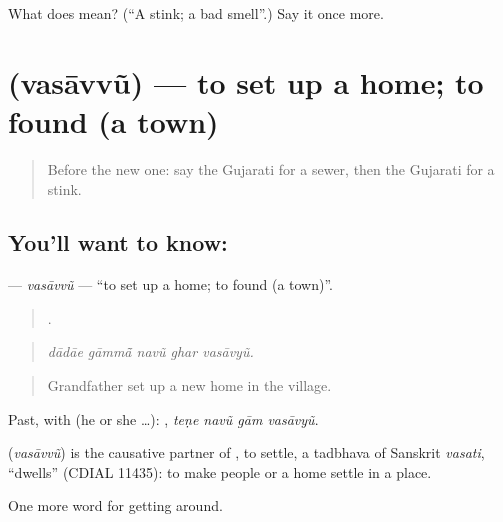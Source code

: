 \begin{tcolorbox}[breakable,colback=teal!4,colframe=teal!35!black,title={Before you move on}]
What does  mean? (\textquotedblleft{}A stink; a bad smell\textquotedblright{}.) Say it once more.
\end{tcolorbox}
\section[\texorpdfstring{\gu{વસાવવું} (vasāvvũ)}{વસાવવું (vasāvvũ)}]{ (vasāvvũ) — to set up a home; to found (a town)}

\label{lesson:GU-C423-vasavvu}



\begin{quote}
Before the new one: say the Gujarati for a sewer, then the Gujarati for a stink.
\end{quote}

\subsection*{You'll want to know: }
\textbf{} — \emph{vasāvvũ} — \textquotedblleft{}to set up a home; to found (a town)\textquotedblright{}.

\begin{quote}
    .
\end{quote}

\begin{quote}
\emph{dādāe gāmmā̃ navũ ghar vasāvyũ.}
\end{quote}

\begin{quote}
Grandfather set up a new home in the village.
\end{quote}

Past, with  (he or she …):    , \emph{teṇe navũ gām vasāvyũ}.

\begin{cousinweb}
\textbf{} (\emph{vasāvvũ}) is the causative partner of , to settle, a tadbhava of Sanskrit \emph{vasati}, \textquotedblleft{}dwells\textquotedblright{} (CDIAL 11435): to make people or a home settle in a place.
\end{cousinweb}

\begin{grammarlens}[title={What you've built}]
One more word for getting around.
\end{grammarlens}

